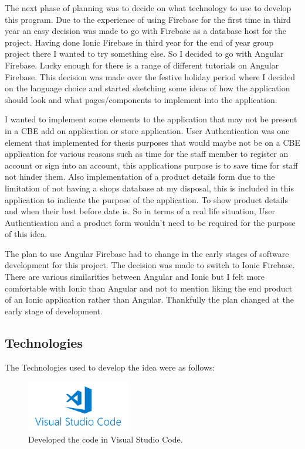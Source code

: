 The next phase of planning was to decide on what technology to use to develop this program. Due to the experience of using Firebase for the first time in third year an easy decision was made to go with Firebase as a database host for the project. Having done Ionic Firebase in third year for the end of year group project there I wanted to try something else. So I decided to go with Angular Firebase. Lucky enough for there is a range of different tutorials on Angular Firebase. This decision was made over the festive holiday period where I decided on the language choice and started sketching some ideas of how the application should look and what pages/components to implement into the application. 
\newline

I wanted to implement some elements to the application that may not be present in a CBE add on application or store application. User Authentication was one element that implemented for thesis purposes that would maybe not be on a CBE application for various reasons such as time for the staff member to register an account or sign into an account, this applications purpose is to save time for staff not hinder them. Also implementation of a product details form due to the limitation of not having a shops database at my disposal, this is included in this application to indicate the purpose of the application. To show product details and when their best before date is. So in terms of a real life situation, User Authentication and a product form wouldn't need to be required for the purpose of this idea. 
\newline

The plan to use Angular Firebase had to change in the early stages of software development for this project. The decision was made to switch to Ionic Firebase. There are various similarities between Angular and Ionic but I felt more comfortable with Ionic than Angular and not to mention liking the end product of an Ionic application rather than Angular. Thankfully the plan changed at the early stage of development.

\subsection{Technologies}
The Technologies used to develop the idea were as follows:
\newline

\begin{figure}[h!]
	\caption{Developed the code in Visual Studio Code.}
	\label{image:vscode}
	\centering
	\includegraphics[width=0.4\textwidth]{images/vscode.png}
\end{figure}

